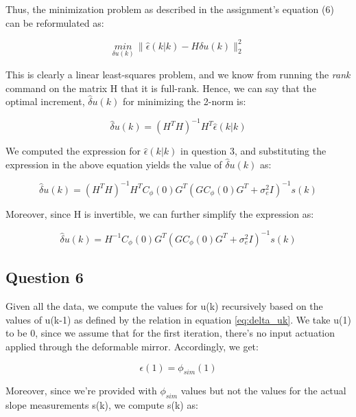 \documentclass[12pt]{report}
\begin{document}
Thus, the minimization problem as described in the assignment's equation (6) can be reformulated as:

\begin{equation*}
	\underset{\delta u(k)}{min} \, \|\hat\epsilon(k|k) - H\delta u(k)\|_{2}^{2}
\end{equation*}

This is clearly a linear least-squares problem, and we know from running the \textit{rank} command on the matrix H that it is full-rank. Hence, we can say that the optimal increment, $\hat\delta u(k)$ for minimizing the 2-norm is:

\begin{equation*}
\hat\delta u(k) = (H^{T}H)^{-1}H^{T}\hat\epsilon(k|k)
\end{equation*}

We computed the expression for $\hat\epsilon(k|k)$ in question 3, and substituting the expression in the above equation yields the value of $\hat\delta u(k)$ as:

\begin{equation*}
\hat\delta u(k) = (H^{T}H)^{-1}H^{T}C_{\phi}(0)G^{T}(GC_{\phi}(0)G^{T} + \sigma_{e}^{2}I)^{-1}s(k)
\end{equation*}

Moreover, since H is invertible, we can further simplify the expression as:

\begin{equation}\label{eq:delta_uk}
\hat\delta u(k) = H^{-1}C_{\phi}(0)G^{T}(GC_{\phi}(0)G^{T} + \sigma_{e}^{2}I)^{-1}s(k)
\end{equation}

\subsection*{Question 6}

Given all the data, we compute the values for u(k) recursively based on the values of u(k-1) as defined by the relation in equation \ref{eq:delta_uk}. We take u(1) to be 0, since we assume that for the first iteration, there's no input actuation applied through the deformable mirror. Accordingly, we get:

\begin{equation*}
\epsilon(1) = \phi_{sim}(1)
\end{equation*}

Moreover, since we're provided with $\phi_{sim}$ values but not the values for the actual slope measurements s(k), we compute s(k) as: 
\end{document}
